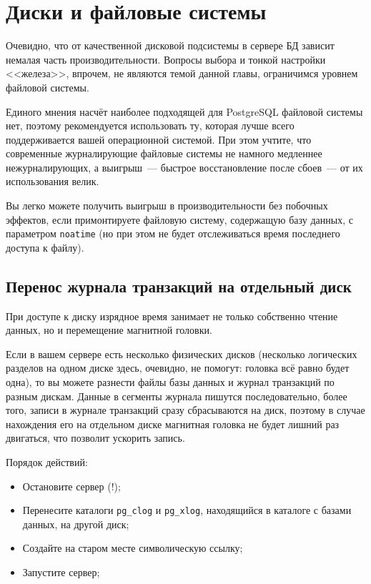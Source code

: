 \section{Диски и файловые системы}
\label{sec:hard-drive-and-file-systems}

Очевидно, что от качественной дисковой подсистемы в сервере БД зависит немалая часть производительности. Вопросы выбора и тонкой настройки <<железа>>, впрочем, не являются темой данной главы, ограничимся уровнем файловой системы.

Единого мнения насчёт наиболее подходящей для PostgreSQL файловой системы нет, поэтому рекомендуется использовать ту, которая лучше всего поддерживается вашей операционной системой. При этом учтите, что современные журналирующие файловые системы не намного медленнее нежурналирующих, а выигрыш~--- быстрое восстановление после сбоев~--- от их использования велик.

Вы легко можете получить выигрыш в производительности без побочных эффектов, если примонтируете файловую систему, содержащую базу данных, с параметром \lstinline!noatime! (но при этом не будет отслеживаться время последнего доступа к файлу).


\subsection{Перенос журнала транзакций на отдельный диск}


При доступе к диску изрядное время занимает не только собственно чтение данных, но и перемещение магнитной головки.

Если в вашем сервере есть несколько физических дисков (несколько логических разделов на одном диске здесь, очевидно, не помогут: головка всё равно будет одна), то вы можете разнести файлы базы данных и журнал транзакций по разным дискам. Данные в сегменты журнала пишутся последовательно, более того, записи в журнале транзакций сразу сбрасываются на диск, поэтому в случае нахождения его на отдельном диске магнитная головка не будет лишний раз двигаться, что позволит ускорить запись.

Порядок действий:

\begin{itemize}
  \item Остановите сервер (!);
  \item Перенесите каталоги \lstinline!pg_clog! и \lstinline!pg_xlog!, находящийся в каталоге с базами данных, на другой диск;
  \item Создайте на старом месте символическую ссылку;
  \item Запустите сервер;
\end{itemize}

